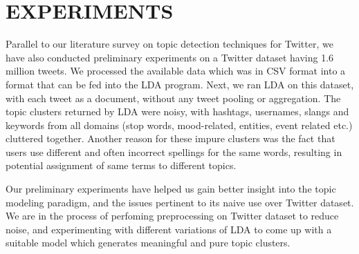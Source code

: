 \section{\uppercase{Experiments}}
Parallel to our literature survey on topic detection techniques for Twitter, we have also conducted preliminary experiments on a Twitter dataset having 1.6 million tweets. We processed the available data which was in CSV format into a format that can be fed into the LDA program. Next, we ran LDA on this dataset, with each tweet as a document, without any tweet pooling or aggregation. The topic clusters returned by LDA were noisy, with hashtags, usernames, slangs and keywords from all domains (stop words, mood-related, entities, event related etc.) cluttered together. Another reason for these impure clusters was the fact that users use different and often incorrect spellings for the same words, resulting in potential assignment of same terms to different topics.

Our preliminary experiments have helped us gain better insight into the topic modeling paradigm, and the issues pertinent to its naive use over Twitter dataset. We are in the process of perfoming preprocessing on Twitter dataset to reduce noise, and experimenting with different variations of LDA to come up with a suitable model which generates meaningful and pure topic clusters.
